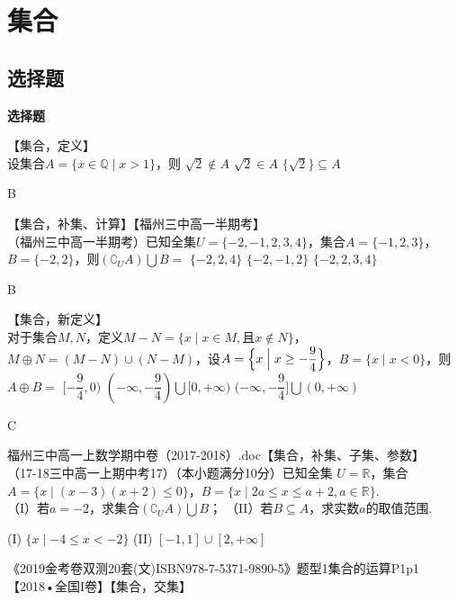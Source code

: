 \startexercise
\section{集合}
  \subsection{选择题}
  \begin{exercise}{\bf 选择题}
    \item 【集合，定义】\\
      设集合$A=\{x\in\mathbb{Q}\mid x>1\}$，则\xz
        {$\sqrt2\notin A$}
        {$\sqrt2\in A$}
        {$\{\sqrt2\}\subseteq A$}
      \begin{answer}
        B
      \end{answer}
    \item 【集合，补集、计算】【福州三中高一半期考】\\
      （福州三中高一半期考）已知全集$U=\{-2,-1,2,3,4\}$，集合$A=\{-1,2,3\}$，$B=\{-2,2\}$，则$(\complement_UA)\bigcup B=$\xz
        {$\{-2,2,4\}$}
        {$\{-2,-1,2\}$}
        {$\{-2,2,3,4\}$}
      \begin{answer}
        B
      \end{answer}
    \item 【集合，新定义】\\
      对于集合$M,N$，定义$M-N=\{x\mid x\in M,\text{且}x\notin N\}$，$M\oplus N=(M-N)\cup(N-M)$，设$A=\Bigl\{x\Bigm| x\geq-\dfrac{9}4\Bigr\}$，$B=\{x\mid x<0\}$，则$A\oplus B=$\xz
        \xx{$(-\dfrac{9}4,0]$}
        {$[-\dfrac{9}4,0)$}
        {$(-\infty,-\dfrac{9}4)\bigcup[0,+\infty)$}
        {$(-\infty,-\dfrac{9}4]\bigcup(0,+\infty)$}
      \begin{answer}
        C
      \end{answer}
    \item 福州三中高一上数学期中卷（2017-2018）.doc【集合，补集、子集、参数】\\
      （17-18三中高一上期中考17）（本小题满分10分）已知全集 $U=\mathbb{R}$，集合$A=\{x\mid (x-3)(x+2)\leq0\} $，$B=\{x\mid 2a\leq x\leq a+2,a\in \mathbb{R} \} $.\\
      （I）若$a=-2 $，求集合$(\complement_UA)\bigcup B $；
      （II）若$B\subseteq A $，求实数$a $的取值范围.
      \begin{answer}
       (I) $\{x\mid-4\leq x<-2 \} $
       (II) $[-1,1]\cup[2,+\infty] $
      \end{answer}
    \item 《2019金考卷双测20套(文)ISBN978-7-5371-9890-5》题型1集合的运算P1p1【2018•全国I卷】【集合，交集】\\

\end{exercise}
